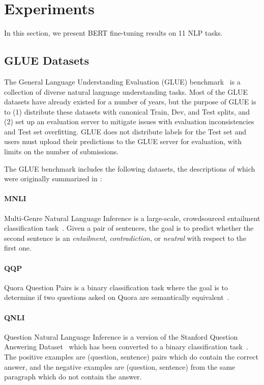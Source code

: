 \section{Experiments}
\label{sec:experiments}

In this section, we present BERT fine-tuning results on 11 NLP tasks.

\subsection{GLUE Datasets}
\label{sec:glue}

The General Language Understanding Evaluation (GLUE) benchmark~\cite{wang-etal:2018:_glue} is a collection of diverse natural language understanding tasks. Most of the GLUE datasets have already existed for a number of years, but the purpose of GLUE is to (1) distribute these datasets with canonical Train, Dev, and Test splits, and (2) set up an evaluation server to mitigate issues with evaluation inconsistencies and Test set overfitting. GLUE does not distribute labels for the Test set and users must upload their predictions to the GLUE server for evaluation, with limits on the number of submissions.
 


The GLUE benchmark includes the following datasets, the descriptions of which were originally summarized in \citet{wang-etal:2018:_glue}:

\paragraph{MNLI} Multi-Genre Natural Language Inference is a large-scale, crowdsourced entailment classification task~\cite{williams-nangia-bowman:2018}. Given a pair of sentences, the goal is to predict whether the second sentence is an {\it entailment}, {\it contradiction}, or {\it neutral} with respect to the first one.

\paragraph{QQP} Quora Question Pairs is a binary classification task where the goal is to determine if two questions asked on Quora are semantically equivalent~\cite{chen-etal:2018:_quora}.

\paragraph{QNLI} Question Natural Language Inference is a version of the Stanford Question Answering Dataset~\cite{rajpurkar-etal:2016:_squad} which has been converted to a binary classification task~\cite{wang-etal:2018:_glue}. The positive examples are (question, sentence) pairs which do contain the correct answer, and the negative examples are (question, sentence) from the same paragraph which do not contain the answer.

